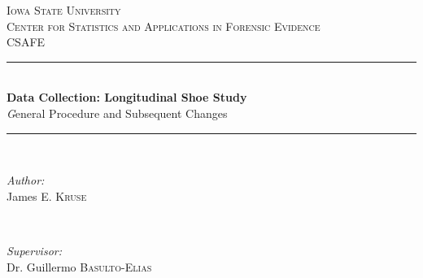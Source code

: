 \begin{titlepage}

\newcommand{\HRule}{\rule{\linewidth}{0.5mm}} %

\center %
 

\textsc{\LARGE Iowa State University}\\[1.75cm] %
\textsc{\Large Center for Statistics and Applications in Forensic Evidence }\\[.5cm] %
\textsc{\large CSAFE}\\[0.5cm] %


\HRule \\[0.4cm]
{ \huge \bfseries Data Collection: Longitudinal Shoe Study  }\\[0.4cm] %
{ \Large \textit General Procedure and Subsequent Changes  }\\[0.2cm] %
\HRule \\[1.5cm]
 

\begin{minipage}{0.4\textwidth}
\begin{flushleft} \large
\emph{Author:}\\
  James \textsc{E. Kruse} %
\end{flushleft}
\end{minipage}
~
\begin{minipage}{0.4\textwidth}
\begin{flushright} \large
\emph{Supervisor:} \\
Dr. Guillermo \textsc{Basulto-Elias} %
\end{flushright}
\end{minipage}\\[2cm]


\end{titlepage}
